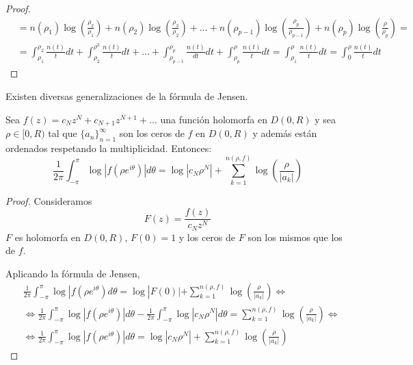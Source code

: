\begin{remark}
\begin{enumerate}
\begin{proof}
\begin{align*}
                       & = n(\rho_1)\log\left(\frac{\rho_2}{\rho_1}\right) + n(\rho_2)\log\left(\frac{\rho_3}{\rho_2}\right) + \dots + n(\rho_{p-1})\log\left(\frac{\rho_p}{\rho_{p-1}}\right) + n(\rho_p)\log\left(\frac{\rho}{\rho_p}\right) =                                           \\
                       & = \int_{\rho_1}^{\rho_2} \frac{n(t)}{t}dt + \int_{\rho_2}^{\rho^3} \frac{n(t)}{t}dt + \dots + \int_{\rho_{p-1}}^{\rho_p} \frac{n(t)}{dt}dt + \int_{\rho_p}^\rho \frac{n(t)}{t}dt = \int_{\rho_1}^\rho \frac{n(t)}{t}dt = \int_0^\rho \frac{n(t)}{t}dt
                  \end{align*}
              \end{proof}
    \end{enumerate}
\end{remark}

Existen diversas generalizaciones de la fórmula de Jensen.

\begin{theorem}
    Sea $f(z) = c_Nz^N + c_{N+1}z^{N+1} + \dots$ una función holomorfa en $D(0, R)$ y sea $\rho \in [0, R)$ tal que $\{a_n\}_{n=1}^\infty$ son los ceros de $f$ en $D(0, R)$ y además están ordenados respetando la multiplicidad.
    Entonces:
    $$\frac{1}{2\pi} \int_{-\pi}^\pi \log|f(\rho e^{i\theta})|d\theta = \log|c_N\rho^N| + \sum_{k=1}^{n(\rho, f)} \log\left(\frac{\rho}{|a_k|}\right)$$
\end{theorem}

\begin{proof}
    Consideramos
    $$F(z) = \frac{f(z)}{c_Nz^N}$$
    $F$ es holomorfa en $D(0, R)$, $F(0) = 1$ y los ceros de $F$ son los mismos que los de $f$.

    Aplicando la fórmula de Jensen,
    \begin{align*}
         & \frac{1}{2\pi} \int_{-\pi}^\pi \log|f(\rho e^{i\theta})d\theta = \log|F(0)| + \sum_{k=1}^{n(\rho, f)} \log\left(\frac{\rho}{|a_k|}\right) \Leftrightarrow                                                             \\
         & \Leftrightarrow \frac{1}{2\pi} \int_{-\pi}^\pi \log|f(\rho e^{i\theta})|d\theta - \frac{1}{2\pi} \int_{-\pi}^\pi \log|c_N\rho^N|d\theta = \sum_{k=1}^{n(\rho, f)} \log\left(\frac{\rho}{|a_k|}\right) \Leftrightarrow \\
         & \Leftrightarrow \frac{1}{2\pi} \int_{-\pi}^\pi \log|f(\rho e^{i\theta})|d\theta = \log|c_N\rho^N| + \sum_{k=1}^{n(\rho, f)} \log\left(\frac{\rho}{|a_k|}\right)
    \end{align*}
\end{proof}

